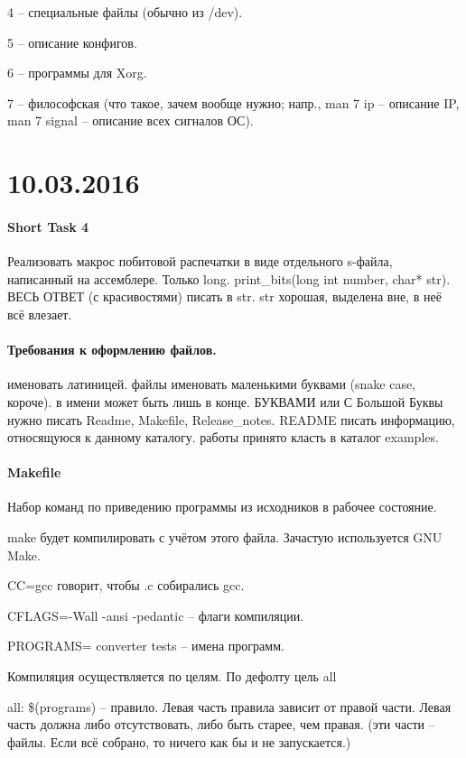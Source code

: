 \documentclass[a4paper,10pt]{article}
\begin{document}
4 -- специальные файлы (обычно из /dev).

5 -- описание конфигов.

6 -- программы для Xorg.

7 -- философская (что такое, зачем вообще нужно; напр., man 7 ip -- описание IP, man 7 signal -- описание всех сигналов ОС).

\section{10.03.2016}
\paragraph{Short Task 4}

Реализовать макрос побитовой распечатки в виде отдельного s-файла, написанный на ассемблере.
Только long.
print\_bits(long int number, char* str). ВЕСЬ ОТВЕТ (с красивостями) писать в str. str хорошая, выделена вне, в неё всё влезает.
\paragraph{Требования к оформлению файлов.}

\begin{enumerate}
 именовать латиницей.
 файлы именовать маленькими буквами (snake case, короче).
 в имени может быть лишь в конце.
 БУКВАМИ или С Большой Буквы нужно писать Readme, Makefile, Release\_notes.
 README писать информацию, относящуюся к данному каталогу.
 работы принято класть в каталог examples.
\end{enumerate}
\paragraph{Makefile}

Набор команд по приведению программы из исходников в рабочее состояние.

make будет компилировать с учётом этого файла. Зачастую используется GNU Make.

CC=gcc говорит, чтобы .c собирались gcc.

CFLAGS=-Wall -ansi -pedantic -- флаги компиляции.

PROGRAMS= converter tests -- имена программ.

Компиляция осуществляется по целям. По дефолту цель all

all: \$(programs) -- правило. Левая часть правила зависит от правой части. Левая часть должна либо отсутствовать, либо быть старее, чем правая. 
(эти части -- файлы. Если всё собрано, то ничего как бы и не запускается.)
\end{document}
